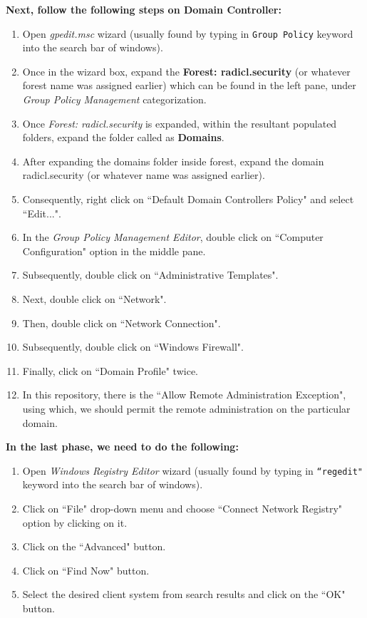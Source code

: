 \documentclass[12pt]{extarticle}
\newcommand{\ben}{\begin{enumerate}}
\newcommand{\een}{\end{enumerate}}
\begin{document}
		\vspace{2mm}	
		\textbf{Next, follow the following steps on Domain Controller:}
		\ben
			\item Open \textit{gpedit.msc} wizard (usually found by typing in \texttt{Group Policy} keyword into the search bar of windows).
			\item Once in the wizard box, expand the \textbf{Forest: radicl.security} (or whatever forest name was assigned earlier) which can be found in the left pane, under \textit{Group Policy Management} categorization.
			\item Once \textit{Forest: radicl.security} is expanded, within the resultant populated folders, expand the folder called as \textbf{Domains}.
			\item After expanding the domains folder inside forest, expand the domain radicl.security (or whatever name was assigned earlier).
			\item Consequently, right click on ``Default Domain Controllers Policy" and select ``Edit...".
			\item In the \textit{Group Policy Management Editor}, double click on ``Computer Configuration" option in the middle pane.
			\item Subsequently, double click on ``Administrative Templates".
			\item Next, double click on ``Network".
			\item Then, double click on ``Network Connection".
			\item Subsequently, double click on ``Windows Firewall".
			\item Finally, click on ``Domain Profile" twice.
			\item In this repository, there is the ``Allow Remote Administration Exception", using which, we should permit the remote administration on the particular domain.
		\een
		
		\vspace{2mm}
		\textbf{In the last phase, we need to do the following:}
		\ben
			\item Open \textit{Windows Registry Editor} wizard (usually found by typing in \texttt{``regedit"} keyword into the search bar of windows).
			\item  Click on ``File" drop-down menu and choose ``Connect Network Registry" option by clicking on it.
			\item  Click on the ``Advanced" button.
			\item  Click on ``Find Now" button.
			\item  Select the desired client system from search results and click on the ``OK" button.
		\een
	
\end{document}
